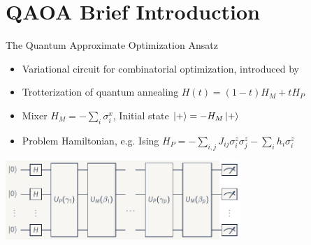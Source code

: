 \documentclass[aspectratio=169]{beamer}
\begin{document}
\section{QAOA Brief Introduction}



\begin{frame}{The Quantum Approximate Optimization Ansatz}
\begin{center}
    \begin{itemize}
        \item Variational circuit for combinatorial optimization, introduced
            by~\citeauthor{farhi2014}~\cite{farhi2014}
        \item Trotterization of quantum annealing $H(t) = (1-t) H_M +
            t H_P$
        \item Mixer $H_M = -\sum_{i} \sigma^x_i$, Initial state $\ket{+} = -H_M \ket{+}$
        \item Problem Hamiltonian, e.g. Ising $H_P = -\sum_{i,j} J_{ij} \sigma^z_i
            \sigma_j^z - \sum_i h_i \sigma_i^z$
    \end{itemize}
    \vspace{6pt}
    \includegraphics[height=3.0cm]{graphics/build/qaoa.pdf}
\end{center}
\end{frame}

\end{document}
